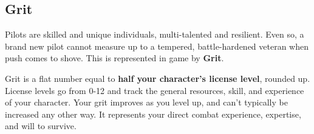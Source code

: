 \subsection{Grit}

Pilots are skilled and unique individuals, multi-talented and resilient. Even so, a brand new pilot
cannot measure up to a tempered, battle-hardened veteran when push comes to shove. This is
represented in game by \textbf{Grit}.

Grit is a flat number equal to \textbf{half your character’s license level}, rounded up. License levels go
from 0-12 and track the general resources, skill, and experience of your character. Your grit
improves as you level up, and can’t typically be increased any other way. It represents your direct
combat experience, expertise, and will to survive.